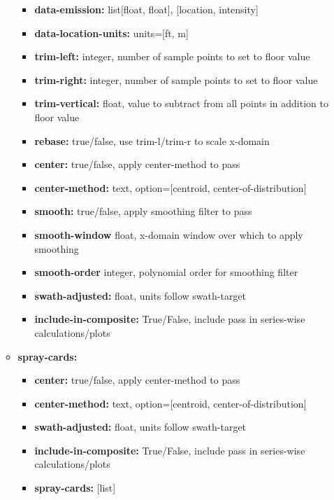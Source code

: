 \documentclass[10pt,letterpaper,titlepage]{article}
\begin{document}
\begin{itemize}
\begin{itemize}
\begin{itemize}
                \item \textbf{data-emission:} list[float, float], [location, intensity]
                \item \textbf{data-location-units:} units=[ft, m]
                \item \textbf{trim-left:} integer, number of sample points to set to floor value
                \item \textbf{trim-right:} integer, number of sample points to set to floor value
                \item \textbf{trim-vertical:} float, value to subtract from all points in addition to floor value
                \item \textbf{rebase:} true/false, use trim-l/trim-r to scale x-domain 
                \item \textbf{center:} true/false, apply center-method to pass
                \item \textbf{center-method:} text, option=[centroid, center-of-distribution]
                \item \textbf{smooth:} true/false, apply smoothing filter to pass
                \item \textbf{smooth-window} float, x-domain window over which to apply smoothing
                \item \textbf{smooth-order} integer, polynomial order for smoothing filter
                \item \textbf{swath-adjusted:} float, units follow swath-target
                \item \textbf{include-in-composite:} True/False, include pass in series-wise calculations/plots
            \end{itemize}
            \item \textbf{spray-cards:}
            \begin{itemize}
                \item \textbf{center:} true/false, apply center-method to pass
                \item \textbf{center-method:} text, option=[centroid, center-of-distribution]
                \item \textbf{swath-adjusted:} float, units follow swath-target
                \item \textbf{include-in-composite:} True/False, include pass in series-wise calculations/plots
                \item \textbf{spray-cards:} [list]
                \begin{itemize}

\end{itemize}
\end{itemize}
\end{itemize}
\end{itemize}
\end{document}
